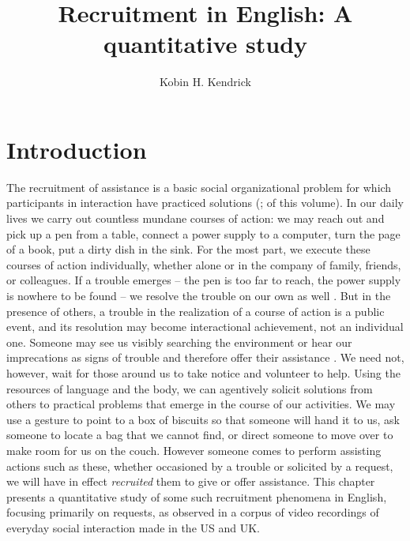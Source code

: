 \documentclass[output=paper,nonflat,modfont,draft]{langsci/langscibook}
\author{Kobin H. Kendrick\affiliation{Department of Language and Linguistic Science, University of York}}
\title{Recruitment in English: A quantitative study}
\begin{document}
\maketitle
\label{sec:kendrick}

\section{Introduction}
The recruitment of assistance is a basic social organizational problem for which participants in interaction have practiced solutions (\citealt{KendrickDrew2016};  of this volume). In our daily lives we carry out countless mundane courses of action: we may reach out and pick up a pen from a table, connect a power supply to a computer, turn the page of a book, put a dirty dish in the sink. For the most part, we execute these courses of action individually, whether alone or in the company of family, friends, or colleagues. If a trouble emerges -- the pen is too far to reach, the power supply is nowhere to be found -- we resolve the trouble on our own as well \citep{Kendrick2017}. But in the presence of others, a trouble in the realization of a course of action is a public event, and its resolution may become interactional achievement, not an individual one. Someone may see us visibly searching the environment \citep{DrewKendrick2018} or hear our imprecations as signs of trouble and therefore offer their assistance \citep{KendrickDrew2016}. We need not, however, wait for those around us to take notice and volunteer to help. Using the resources of language and the body, we can agentively solicit solutions from others to practical problems that emerge in the course of our activities. We may use a gesture to point to a box of biscuits so that someone will hand it to us, ask someone to locate a bag that we cannot find, or direct someone to move over to make room for us on the couch. However someone comes to perform assisting actions such as these, whether occasioned by a trouble or solicited by a request, we will have in effect \textit{recruited} them to give or offer assistance. This chapter presents a quantitative study of some such recruitment phenomena in English, focusing primarily on requests, as observed in a corpus of video recordings of everyday social interaction made in the US and UK.
\end{document}

